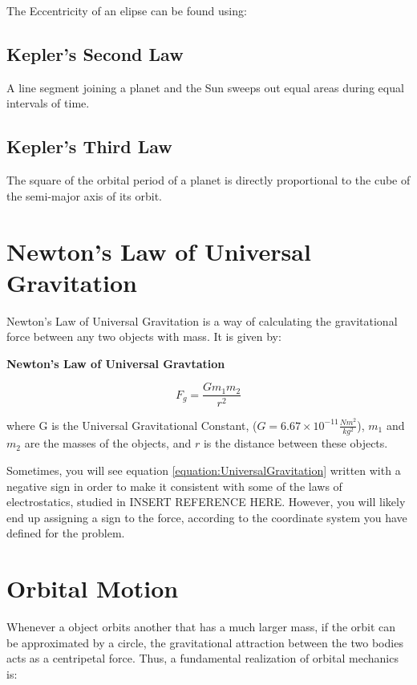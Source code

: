 		The Eccentricity of an elipse can be found using: 
		
	
	\subsection{Kepler's Second Law}
		A line segment joining a planet and the Sun sweeps out equal areas during equal intervals of time.
		
		
		
	\subsection{Kepler's Third Law}
			The square of the orbital period of a planet is directly proportional to the cube of the semi-major axis of its orbit.
	
	
	
	
	\section{Newton's Law of Universal Gravitation} 
	
	Newton's Law of Universal Gravitation is a way of calculating the gravitational force between any two objects with mass.  It is given by: 
	\begin{mdframed}[backgroundcolor=orange!20!white]
		\begin{center}
\textbf{Newton's Law of Universal Gravtation}
		\end{center}
		\begin{equation}
		F_g = \frac{G m_1m_2}{r^2}
		\label{equation:UniversalGravitation}
		\end{equation}
	\end{mdframed}
	where G is the Universal Gravitational Constant, ($G = 6.67 \times 10^{-11} \frac{Nm^2}{kg^2}$), $m_1$ and $m_2$ are the masses of the objects, and $r$ is the distance between these objects.   
	
	
	Sometimes, you will see equation \ref{equation:UniversalGravitation} written with a negative sign in order to make it consistent with some of the laws of electrostatics, studied in \color{red} INSERT REFERENCE HERE\color{black}. However, you will likely end up assigning a sign to the force, according to the coordinate system you have defined for the problem. 
	
	
	
	\section{Orbital Motion} 
	Whenever a object orbits another that has a much larger mass, if the orbit can be approximated by a circle, the gravitational attraction between the two bodies acts as a centripetal force.  Thus, a fundamental realization of orbital mechanics is:
	

		


	


